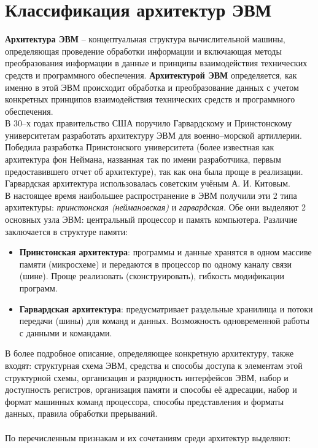 \section{Классификация архитектур ЭВМ}
\textbf{Архитектура ЭВМ} -- концептуальная структура вычислительной машины, определяющая проведение обработки информации и включающая методы преобразования информации в данные и принципы взаимодействия технических средств и программного обеспечения. \textbf{Архитектурой ЭВМ} определяется, как именно в этой ЭВМ происходит обработка и преобразование данных с учетом конкретных принципов взаимодействия технических средств и программного обеспечения.
\\В 30--х годах правительство США поручило Гарвардскому и Принстонскому университетам разработать архитектуру ЭВМ для военно--морской артиллерии. Победила разработка Принстонского университета (более известная как архитектура фон Неймана, названная так по имени разработчика, первым предоставившего отчет об архитектуре), так как она была проще в реализации. Гарвардская архитектура использовалась советским учёным А. И. Китовым.
\\В настоящее время наибольшее распространение в ЭВМ получили эти 2 типа архитектуры: \emph{принстонская (неймановская)} и \emph{гарвардская}. Обе они выделяют 2 основных узла ЭВМ: центральный процессор и память компьютера. Различие заключается в структуре памяти:
\begin{itemize}
  \item \textbf{Принстонская архитектура}: программы и данные хранятся в одном массиве памяти (микросхеме) и передаются в процессор по одному каналу связи (шине). Проще реализовать (сконструировать), гибкость модификации программ.
  \item \textbf{Гарвардская архитектура}: предусматривает раздельные хранилища и потоки передачи (шины) для команд и данных. Возможность одновременной работы с данными и командами.
\end{itemize}
В более подробное описание, определяющее конкретную архитектуру, также входят: структурная схема ЭВМ, средства и способы доступа к элементам этой структурной схемы, организация и разрядность интерфейсов ЭВМ, набор и доступность регистров, организация памяти и способы её адресации, набор и формат машинных команд процессора, способы представления и форматы данных, правила обработки прерываний. \\
\\По перечисленным признакам и их сочетаниям среди архитектур выделяют:

